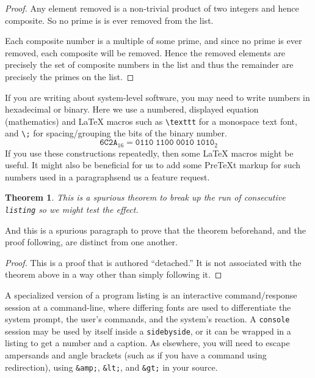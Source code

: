 \documentclass[pdflatex]{sn-jnl}
\theoremstyle{thmstyleone}%
\newtheorem{theorem}{Theorem}[section]
\theoremstyle{thmstyletwo}%
\theoremstyle{thmstylethree}%
\newcommand{\mono}[1]{\texttt{#1}}
\numberwithin{equation}{section}
\begin{document}
\begin{proof}\label{algorithm-sieve-eratosthenes-3}%
Any element removed is a non-trivial product of two integers and hence composite.  So no prime is is ever removed from the list.%
\par
Each composite number is a multiple of some prime, and since no prime is ever removed, each composite will be removed.  Hence the removed elements are precisely the set of composite numbers in the list and thus the remainder are precisely the primes on the list.%
\end{proof}
%
If you are writing about system-level software, you may need to write numbers in hexadecimal or binary.  Here we use a numbered, displayed equation (mathematics) and \LaTeX{} macros such as \mono{\textbackslash{}texttt} for a monospace text font, and \mono{\textbackslash{};} for spacing\slash{}grouping the bits of the binary number.%
\begin{equation}
\texttt{6C2A}_{16} = \texttt{0110}\;\texttt{1100}\;\texttt{0010}\;\texttt{1010}_{2}\label{section-programs-24-4}
\end{equation}
If you use these constructions repeatedly, then some \LaTeX{} macros might be useful.  It might also be beneficial for us to add some PreTeXt markup for such numbers used in a paragraph\textemdash{}send us a feature request.%
\begin{theorem}\label{theorem-detached}%
%
This is a spurious theorem to break up the run of consecutive \mono{listing} so we might test the effect.%
\end{theorem}
And this is a spurious paragraph to prove that the theorem beforehand, and the proof following, are distinct from one another.%
\begin{proof}\label{section-programs-27}%
This is a proof that is authored ``detached.''  It is not associated with the theorem above in a way other than simply following it.%
\end{proof}
A specialized version of a program listing is an interactive command\slash{}response session at a command-line, where differing fonts are used to differentiate the system prompt, the user's commands, and the system's reaction.  A   \mono{console} session may be used by itself inside a \mono{sidebyside}, or it can be wrapped in a listing to get a number and a caption.  As elsewhere, you will need to escape ampersands and angle brackets (such as if you have a command using redirection), using \mono{\&amp;}, \mono{\&lt;}, and \mono{\&gt;} in your source.%
\end{document}
